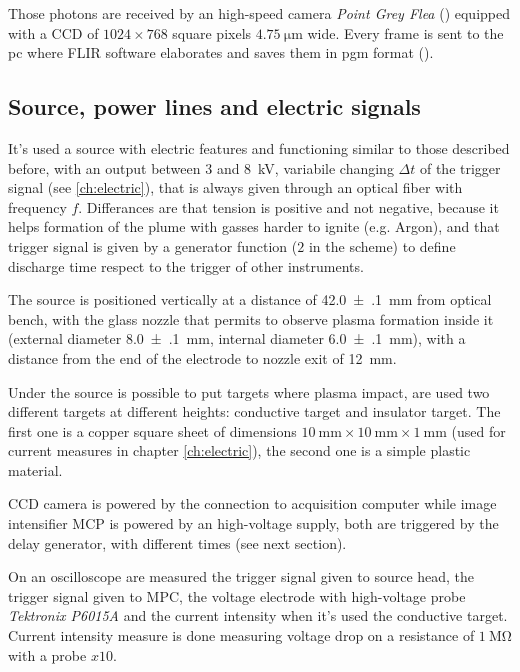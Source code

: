 Those photons are received by an high-speed camera \emph{Point Grey Flea} (\cite{flea}) equipped with a CCD of $\num{1024} \times \num{768}$ square pixels $\SI{4.75}{\micro\meter}$ wide. Every frame is sent to the pc where FLIR software elaborates and saves them in pgm format (\cite{pgm}).

\subsection{Source, power lines and electric signals}
It's used a source with electric features and functioning similar to those described before, with an output between $\num{3}$ and \SI{8}{\kilo\volt}, variabile changing $\Delta t$ of the trigger signal (see \ref{ch:electric}), that is always given through an optical fiber with frequency $f$. Differances are that tension is positive and not negative, because it helps formation of the plume with gasses harder to ignite (e.g. Argon), and that trigger signal is given by a generator function ($2$ in the scheme) to define discharge time respect to the trigger of other instruments.

The source is positioned vertically at a distance of \SI{42.0(1)}{\milli\meter} from optical bench, with the glass nozzle that permits to observe plasma formation inside it (external diameter \SI{8.0(1)}{\milli\meter}, internal diameter \SI{6.0(1)}{\milli\meter}), with a distance from the end of the electrode to nozzle exit of \SI{12}{\milli\meter}.

Under the source is possible to put targets where plasma impact, are used two different targets at different heights: conductive target and insulator target. The first one is a copper square sheet of dimensions $\SI{10}{\milli\meter} \times \SI{10}{\milli\meter} \times \SI{1}{\milli\meter}$ (used for current measures in chapter \ref{ch:electric}), the second one is a simple plastic material.


CCD camera is powered by the connection to acquisition computer while image intensifier MCP is powered by an high-voltage supply, both are triggered by the delay generator, with different times (see next section).


On an oscilloscope are measured the trigger signal given to source head, the trigger signal given to MPC, the voltage electrode with high-voltage probe \emph{Tektronix P6015A} and the current intensity when it's used the conductive target. Current intensity measure is done measuring voltage drop on a resistance of $\SI{1}{\mega\ohm}$ with a probe $x\num{10}$.

